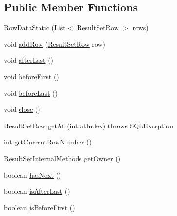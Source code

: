 \subsection*{Public Member Functions}
\begin{DoxyCompactItemize}
\item 
\mbox{\hyperlink{classcom_1_1mysql_1_1jdbc_1_1_row_data_static_ab6e9d67d17a82c44e72d8b47bf85f2a0}{Row\+Data\+Static}} (List$<$ \mbox{\hyperlink{classcom_1_1mysql_1_1jdbc_1_1_result_set_row}{Result\+Set\+Row}} $>$ rows)
\item 
void \mbox{\hyperlink{classcom_1_1mysql_1_1jdbc_1_1_row_data_static_aa873d9a679baca7346e37b4c60b5ab52}{add\+Row}} (\mbox{\hyperlink{classcom_1_1mysql_1_1jdbc_1_1_result_set_row}{Result\+Set\+Row}} row)
\item 
void \mbox{\hyperlink{classcom_1_1mysql_1_1jdbc_1_1_row_data_static_a73788dcf4de42302d7accc1846138fbf}{after\+Last}} ()
\item 
void \mbox{\hyperlink{classcom_1_1mysql_1_1jdbc_1_1_row_data_static_a54d6e62be02d4dac8e48a6eef0b2d839}{before\+First}} ()
\item 
void \mbox{\hyperlink{classcom_1_1mysql_1_1jdbc_1_1_row_data_static_a9e4636345525191c4dfa6ac57a3a05dc}{before\+Last}} ()
\item 
void \mbox{\hyperlink{classcom_1_1mysql_1_1jdbc_1_1_row_data_static_a4c172a40caf7d38d4ae5441a9ea46d45}{close}} ()
\item 
\mbox{\hyperlink{classcom_1_1mysql_1_1jdbc_1_1_result_set_row}{Result\+Set\+Row}} \mbox{\hyperlink{classcom_1_1mysql_1_1jdbc_1_1_row_data_static_a02904125e29bcc258c12f839338a4937}{get\+At}} (int at\+Index)  throws S\+Q\+L\+Exception 
\item 
int \mbox{\hyperlink{classcom_1_1mysql_1_1jdbc_1_1_row_data_static_a199a2308d1218dbf9807a32158e307f4}{get\+Current\+Row\+Number}} ()
\item 
\mbox{\hyperlink{interfacecom_1_1mysql_1_1jdbc_1_1_result_set_internal_methods}{Result\+Set\+Internal\+Methods}} \mbox{\hyperlink{classcom_1_1mysql_1_1jdbc_1_1_row_data_static_af72520ce25978b10995a00de1bd2ecc4}{get\+Owner}} ()
\item 
boolean \mbox{\hyperlink{classcom_1_1mysql_1_1jdbc_1_1_row_data_static_aaa4aefb2beeb7f12906587084204cee1}{has\+Next}} ()
\item 
boolean \mbox{\hyperlink{classcom_1_1mysql_1_1jdbc_1_1_row_data_static_a811d6084ea40248a5e4fb6406f96e404}{is\+After\+Last}} ()
\item 
boolean \mbox{\hyperlink{classcom_1_1mysql_1_1jdbc_1_1_row_data_static_acd81997ad7a1cfc35fbd6e066dd42525}{is\+Before\+First}} ()

\end{DoxyCompactItemize}
